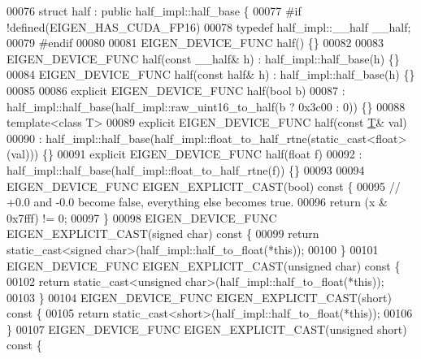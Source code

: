 \begin{DoxyCode}
00076 \textcolor{keyword}{struct }half : \textcolor{keyword}{public} half\_impl::half\_base \{
00077 \textcolor{preprocessor}{  #if !defined(EIGEN\_HAS\_CUDA\_FP16)}
00078     \textcolor{keyword}{typedef} half\_impl::\_\_half \_\_half;
00079 \textcolor{preprocessor}{  #endif}
00080 
00081   EIGEN\_DEVICE\_FUNC half() \{\}
00082 
00083   EIGEN\_DEVICE\_FUNC half(\textcolor{keyword}{const} \_\_half& h) : half\_impl::half\_base(h) \{\}
00084   EIGEN\_DEVICE\_FUNC half(\textcolor{keyword}{const} half& h) : half\_impl::half\_base(h) \{\}
00085 
00086   \textcolor{keyword}{explicit} EIGEN\_DEVICE\_FUNC half(\textcolor{keywordtype}{bool} b)
00087       : half\_impl::half\_base(half\_impl::raw\_uint16\_to\_half(b ? 0x3c00 : 0)) \{\}
00088   \textcolor{keyword}{template}<\textcolor{keyword}{class} T>
00089   \textcolor{keyword}{explicit} EIGEN\_DEVICE\_FUNC half(\textcolor{keyword}{const} \hyperlink{group___sparse_core___module_class_eigen_1_1_triplet}{T}& val)
00090       : half\_impl::half\_base(half\_impl::float\_to\_half\_rtne(static\_cast<float>(val))) \{\}
00091   \textcolor{keyword}{explicit} EIGEN\_DEVICE\_FUNC half(\textcolor{keywordtype}{float} f)
00092       : half\_impl::half\_base(half\_impl::float\_to\_half\_rtne(f)) \{\}
00093 
00094   EIGEN\_DEVICE\_FUNC EIGEN\_EXPLICIT\_CAST(\textcolor{keywordtype}{bool})\textcolor{keyword}{ const }\{
00095     \textcolor{comment}{// +0.0 and -0.0 become false, everything else becomes true.}
00096     \textcolor{keywordflow}{return} (x & 0x7fff) != 0;
00097   \}
00098   EIGEN\_DEVICE\_FUNC EIGEN\_EXPLICIT\_CAST(\textcolor{keywordtype}{signed} \textcolor{keywordtype}{char})\textcolor{keyword}{ const }\{
00099     \textcolor{keywordflow}{return} \textcolor{keyword}{static\_cast<}\textcolor{keywordtype}{signed} \textcolor{keywordtype}{char}\textcolor{keyword}{>}(half\_impl::half\_to\_float(*\textcolor{keyword}{this}));
00100   \}
00101   EIGEN\_DEVICE\_FUNC EIGEN\_EXPLICIT\_CAST(\textcolor{keywordtype}{unsigned} \textcolor{keywordtype}{char})\textcolor{keyword}{ const }\{
00102     \textcolor{keywordflow}{return} \textcolor{keyword}{static\_cast<}\textcolor{keywordtype}{unsigned} \textcolor{keywordtype}{char}\textcolor{keyword}{>}(half\_impl::half\_to\_float(*\textcolor{keyword}{this}));
00103   \}
00104   EIGEN\_DEVICE\_FUNC EIGEN\_EXPLICIT\_CAST(\textcolor{keywordtype}{short})\textcolor{keyword}{ const }\{
00105     \textcolor{keywordflow}{return} \textcolor{keyword}{static\_cast<}\textcolor{keywordtype}{short}\textcolor{keyword}{>}(half\_impl::half\_to\_float(*\textcolor{keyword}{this}));
00106   \}
00107   EIGEN\_DEVICE\_FUNC EIGEN\_EXPLICIT\_CAST(\textcolor{keywordtype}{unsigned} \textcolor{keywordtype}{short})\textcolor{keyword}{ const }\{

\end{DoxyCode}
